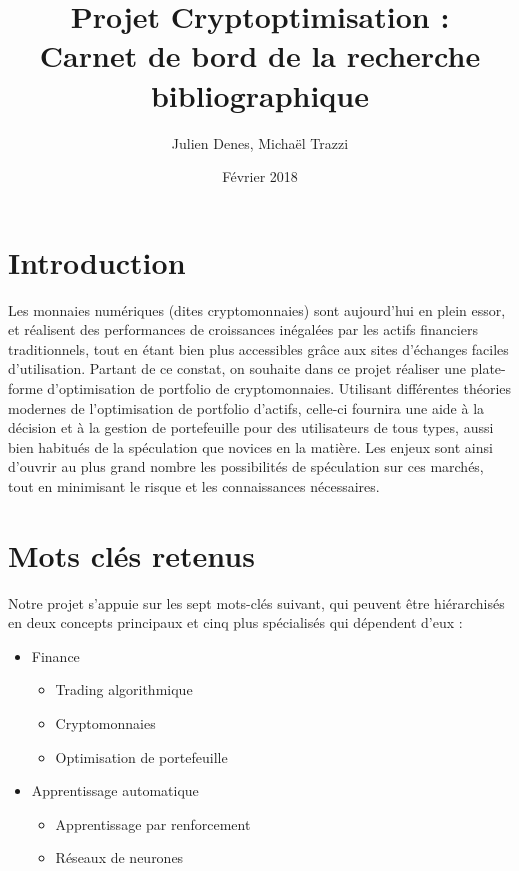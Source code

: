 \documentclass[a4paper]{article}
\title{Projet Cryptoptimisation :\\Carnet de bord de la recherche bibliographique}
\author[]{Julien Denes, Michaël Trazzi}
\affil[]{Master 1 Informatique, spécialité ANDROIDE\\Sorbonne Université}
\date{Février 2018}
\begin{document}
\maketitle

\section{Introduction}

Les monnaies numériques (dites cryptomonnaies) sont aujourd'hui en plein essor, et réalisent des performances de croissances inégalées par les actifs financiers traditionnels, tout en étant bien plus accessibles grâce aux sites d'échanges faciles d'utilisation. Partant de ce constat, on souhaite dans ce projet réaliser une plate-forme d’optimisation de portfolio de cryptomonnaies. Utilisant différentes théories modernes de l'optimisation de portfolio d'actifs, celle-ci fournira une aide à la décision et à la gestion de portefeuille pour des utilisateurs de tous types, aussi bien habitués de la spéculation que novices en la matière. Les enjeux sont ainsi d'ouvrir au plus grand nombre les possibilités de spéculation sur ces marchés, tout en minimisant le risque et les connaissances nécessaires.

\section{Mots clés retenus}

Notre projet s'appuie sur les sept mots-clés suivant, qui peuvent être hiérarchisés en deux concepts principaux et cinq plus spécialisés qui dépendent d'eux :

\begin{itemize}
    \item Finance
    \begin{itemize}
        \item Trading algorithmique
        \item Cryptomonnaies
        \item Optimisation de portefeuille
    \end{itemize}
    \item Apprentissage automatique
    \begin{itemize}
        \item Apprentissage par renforcement
        \item Réseaux de neurones
    \end{itemize}
\end{itemize}
\end{document}
